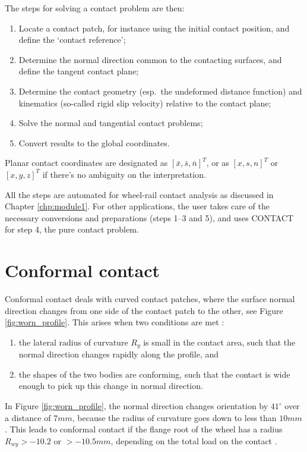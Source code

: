 \documentclass[12pt]{report}
\begin{document}
The steps for solving a contact problem are then:
\begin{enumerate}
\item Locate a contact patch, for instance using the initial contact
        position, and define the `contact reference';
\item Determine the normal direction common to the contacting surfaces, and
        define the tangent contact plane;
\item Determine the contact geometry (esp.\ the undeformed distance
        function) and kinematics (so-called rigid slip velocity) relative to the
        contact plane;
\item Solve the normal and tangential contact problems;
\item Convert results to the global coordinates.
\end{enumerate}
Planar contact coordinates are designated as $[\bar{x},\bar{s},\bar{n}]^T$,
or as $[x,s,n]^T$ or $[x,y,z]^T$ if there's no ambiguity on the
interpretation.

All the steps are automated for wheel-rail contact analysis as discussed in
Chapter \ref{chp:module1}.  For other applications, the user takes care of
the necessary conversions and preparations (steps 1--3 and 5), and uses
CONTACT for step 4, the pure contact problem.

\section{Conformal contact}

Conformal contact deals with curved contact patches, where the surface
normal direction changes from one side of the contact patch to the other,
see Figure \ref{fig:worn_profile}. This arises when two conditions are met
\cite{Vollebregt2018b-corrigendum}:
\begin{enumerate}
\item the lateral radius of curvature $R_y$ is small in the contact area,
        such that the normal direction changes rapidly along the profile,
        and
\item the shapes of the two bodies are conforming, such that the contact is
        wide enough to pick up this change in normal direction.
\end{enumerate}
In Figure \ref{fig:worn_profile}, the normal direction changes orientation
by $41^\circ$ over a distance of $7\unit{mm}$, because the radius of curvature
goes down to less than $10\unit{mm}$. This leads to conformal contact if the
flange root of the wheel has a radius $R_{wy}>-10.2$ or $>-10.5\unit{mm}$,
depending on the total load on the contact \cite{Vollebregt2018b-corrigendum}.
\end{document}
